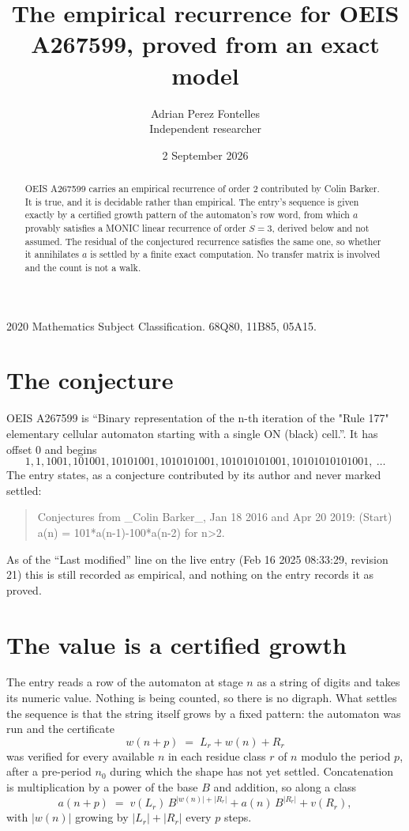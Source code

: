 \documentclass[11pt,a4paper]{article}
\title{The empirical recurrence for OEIS A267599, proved from an exact model}
\author{Adrian Perez Fontelles\\ \small Independent researcher}
\date{2 September 2026}
\theoremstyle{plain}
\theoremstyle{definition}
\begin{document}
\maketitle

\begin{abstract}
OEIS A267599 carries an empirical recurrence of order $2$ contributed by Colin Barker. It is true, and it is
decidable rather than empirical. The entry's sequence is given exactly by a certified growth pattern of the automaton's row word, from
which $a$ provably satisfies a MONIC linear recurrence of order $S=3$, derived below and not
assumed. The residual of the conjectured recurrence satisfies the same one, so whether it
annihilates $a$ is settled by a finite exact computation. No transfer matrix is involved and
the count is not a walk.
\end{abstract}

\noindent\small 2020 Mathematics Subject Classification. 68Q80, 11B85, 05A15.\normalsize

\section{The conjecture}

OEIS A267599 is ``Binary representation of the n-th iteration of the "Rule 177" elementary cellular automaton starting with a single ON (black) cell.''. It has offset $0$ and begins
\[
1, 1, 1001, 101001, 10101001, 1010101001, 101010101001, 10101010101001,\ \dots
\]
The entry states, as a conjecture contributed by its author and never marked settled:
\begin{quote}
Conjectures from \_Colin Barker\_, Jan 18 2016 and Apr 20 2019: (Start) a(n) = 101*a(n-1)-100*a(n-2) for n>2.
\end{quote}
As of the ``Last modified'' line on the live entry (Feb 16 2025 08:33:29, revision 21)
this is still recorded as empirical, and nothing on the entry records it as proved.

\section{The value is a certified growth}

The entry reads a row of the automaton at stage $n$ as a string of digits and takes its
numeric value. Nothing is being counted, so there is no digraph. What settles the sequence is
that the string itself grows by a fixed pattern: the automaton was run and the certificate
\[
w(n+p)\;=\;L_r + w(n) + R_r
\]
was verified for every available $n$ in each residue class $r$ of $n$ modulo the period $p$,
after a pre-period $n_0$ during which the shape has not yet settled. Concatenation is
multiplication by a power of the base $B$ and addition, so along a class
\[
a(n+p)\;=\;v(L_r)\,B^{|w(n)|+|R_r|} + a(n)\,B^{|R_r|} + v(R_r),
\]
with $|w(n)|$ growing by $|L_r|+|R_r|$ every $p$ steps.
\end{document}
